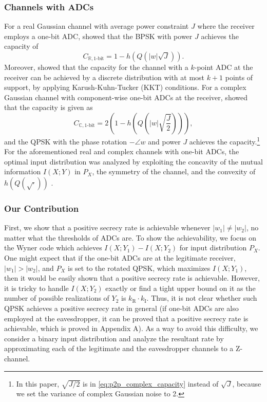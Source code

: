 \documentclass[journal]{IEEEtran}
\begin{document}
\subsubsection{Channels with ADCs}
For a real Gaussian channel with average power constraint $J$ where the receiver employs a one-bit ADC, \cite{p2pADC} showed that the BPSK with power $J$ achieves the capacity of 
\begin{equation}
    C_{\mathbb{R},1\text{-bit}} = 1-h\left(Q\left(|w|\sqrt{J}\right)\right).
\end{equation}
Moreover, \cite{p2pADC} showed that the capacity for the channel with a $k$-point ADC at the receiver can be achieved by a discrete distribution with at most $k+1$ points of support, by applying Karush-Kuhn-Tucker (KKT) conditions.
For a complex Gaussian channel with component-wise one-bit ADCs at the receiver, \cite{MIMO_onebit_capacity} showed that the  capacity is given as 
\begin{equation} 
    C_{\mathbb{C},\text{1-bit}} = 2\left(1-h\left(Q\left(|w|\sqrt{\frac{J}{2}}\right)\right)\right), \label{eq:p2p_complex_capacity}
\end{equation}
and the QPSK with the phase rotation $-\angle w$ and power $J$ achieves the capacity.\footnote{In this paper, $\sqrt{J/2}$ is in \eqref{eq:p2p_complex_capacity} instead of $\sqrt{J}$, because we set the variance of complex Gaussian noise to 2.}
For the aforementioned real and complex channels with one-bit ADCs, the optimal input distribution was analyzed by exploiting the concavity of the mutual information $I(X;Y)$ in $P_X$, the symmetry of the channel, and the convexity of $h(Q(\sqrt{\cdot}))$ \cite{hqsqrt}.




\subsubsection{Our Contribution}

First, we show that a positive secrecy rate is achievable whenever $|w_1| \neq |w_2|$, no matter what the thresholds of ADCs are. To show the achievability, we focus on the Wyner code  \cite{wyner} which achieves $I(X;Y_1)-I(X;Y_2)$ for input distribution $P_X$. 
One might expect that if the one-bit ADCs are at the legitimate receiver, $|w_1|>|w_2|$, and $P_X$ is set to the rotated QPSK, which maximizes $I(X;Y_1)$, then it would be easily shown that a positive secrecy rate is achievable. 
However, it is tricky to handle $I(X;Y_2)$ exactly or find a tight upper bound on it  as the number of possible realizations of $Y_2$ is $k_{\mathrm{R}} \cdot k_{\mathrm{I}}$. Thus, it is not clear whether such QPSK achieves a positive secrecy rate in general (if  one-bit ADCs are also employed at the eavesdropper, it can be proved that a positive secrecy rate is achievable, which is proved in Appendix A).
As a way to avoid this difficulty, we consider a binary input distribution and analyze the resultant rate by approximating each of the legitimate and the eavesdropper channels to a Z-channel. 
\end{document}
